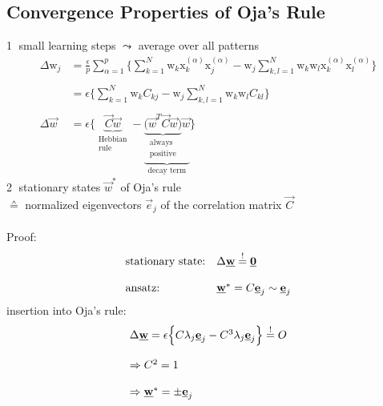 \subsection{Convergence Properties of Oja's Rule}
\textcircled{1} small learning steps $\leadsto$ average over all patterns
\begin{equation}
	\begin{array}{ll}
	\Delta \mathrm{w}_j 
		& = \frac{\epsilon}{p} \sum\limits_{\alpha = 1}^p
			\bigg\{ \sum\limits_{k = 1}^N \mathrm{w}_k 
			\mathrm{x}_k^{(\alpha)} \mathrm{x}_j^{(\alpha)}
			- \mathrm{w}_j \sum\limits_{k,l = 1}^N
			\mathrm{w}_k \mathrm{w}_l 
			\mathrm{x}_k^{(\alpha)} \mathrm{x}_l^{(\alpha)}
			\bigg\} \\\\
		& = \epsilon \bigg\{ \sum\limits_{k = 1}^N 
			\mathrm{w}_k C_{kj} - \mathrm{w}_j
			\sum\limits_{k,l = 1}^N \mathrm{w}_k \mathrm{w}_l
			C_{kl}
			\bigg\} \\\\
	\Delta \vec{w} & = \epsilon \Big\{ 
		\underbrace{ \vec{C} \vec{w} }_{
			\substack{\text{Hebbian} \\ \text{rule}}}
		- \underbrace{ 
			\underbrace{ \big( \vec{w}^T \vec{C} \vec{w} \big) }_{
			\substack{\text{always} \\ \text{positive}}}
			\vec{w} }_{\text{decay term}} \Big\}
	\end{array}
\end{equation}
\textcircled{2} stationary states $\vec{w}^*$ of Oja's rule \\
\indent$\corresponds$ normalized eigenvectors $\vec{e}_j$ of the correlation matrix $\vec{C}$\\\\
Proof:
\[ \begin{array}{ll}
	\text{stationary state:} 
	& \Delta \underline{\mathbf{w}} \stackrel{\mathrm{!}}{=} \underline{\mathbf{0}} \\\\
	\text{ansatz:} 
	& \underline{\mathbf{w}}^* = C \underline{\mathbf{e}}_j \sim  \underline{\mathbf{e}}_j
\end{array} \]
insertion into Oja's rule:
\begin{equation}
	\begin{array}{l}
	\Delta \underline{\mathbf{w}} = \epsilon \Big\{ C \lambda_j \underline{\mathbf{e}}_j
		- C^3 \lambda_j \underline{\mathbf{e}}_j 
		\Big\} \stackrel{\mathrm{!}}{=} O \\\\
	\Rightarrow C^2 = 1 \\\\
	\Rightarrow \underline{\mathbf{w}}^* = \pm \underline{\mathbf{e}}_j
	\end{array}
\end{equation}
